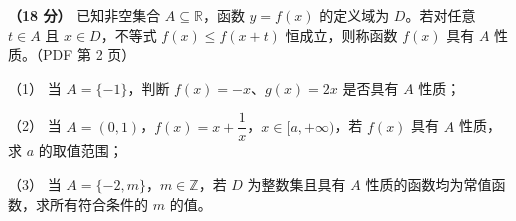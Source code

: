 \begin{question}
\textbf{（18 分）} 已知非空集合 $A\subseteq\mathbb R$，函数 $y=f(x)$ 的定义域为 $D$。若对任意 $t\in A$ 且 $x\in D$，不等式 $f(x)\leq f(x+t)$ 恒成立，则称函数 $f(x)$ 具有 $A$ 性质。（PDF 第 2 页）

（1） 当 $A=\{-1\}$，判断 $f(x)=-x$、$g(x)=2x$ 是否具有 $A$ 性质；

（2） 当 $A=(0,1)$，$f(x)=x+\dfrac1x$，$x\in[a,+\infty)$，若 $f(x)$ 具有 $A$ 性质，求 $a$ 的取值范围；

（3） 当 $A=\{-2,m\}$，$m\in\mathbb Z$，若 $D$ 为整数集且具有 $A$ 性质的函数均为常值函数，求所有符合条件的 $m$ 的值。

\end{question}